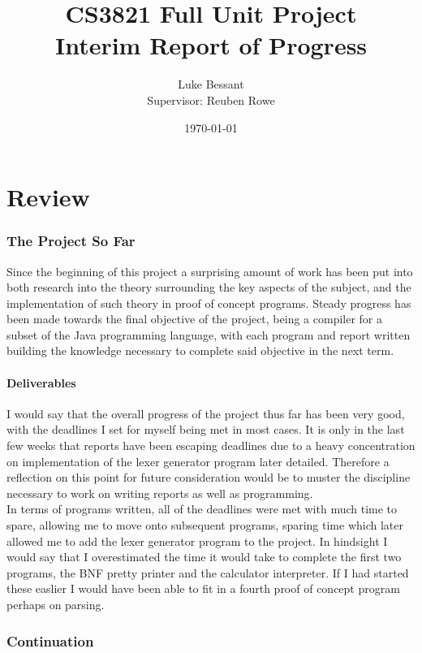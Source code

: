 \documentclass[a4paper, 11pt]{article}
\title{\textbf{CS3821 Full Unit Project}\\Interim Report of Progress}
\author{Luke Bessant\\Supervisor: Reuben Rowe}
\date{\today}
\begin{document}
\maketitle
\thispagestyle{title}
\newpage

\tableofcontents
\clearpage
\newpage

\part{Review}
\section{The Project So Far}
Since the beginning of this project a surprising amount of work has been put into both research into the theory surrounding the key aspects of the subject, and the implementation of such theory in proof of concept programs. Steady progress has been made towards the final objective of the project, being a compiler for a subset of the Java programming language, with each program and report written building the knowledge necessary to complete said objective in the next term.

\subsection{Deliverables}
I would say that the overall progress of the project thus far has been very good, with the deadlines I set for myself being met in most cases. It is only in the last few weeks that reports have been escaping deadlines due to a heavy concentration on implementation of the lexer generator program later detailed. Therefore a reflection on this point for future consideration would be to muster the discipline necessary to work on writing reports as well as programming.
\\\newline
In terms of programs written, all of the deadlines were met with much time to spare, allowing me to move onto subsequent programs, sparing time which later allowed me to add the lexer generator program to the project. In hindsight I would say that I overestimated the time it would take to complete the first two programs, the BNF pretty printer and the calculator interpreter. If I had started these easlier I would have been able to fit in a fourth proof of concept program perhaps on parsing.

\section{Continuation}
\end{document}
